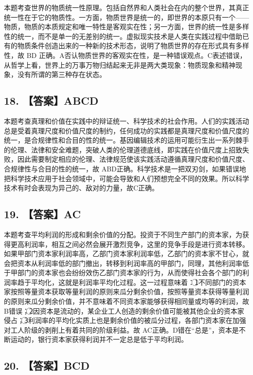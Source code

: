 \documentclass[UTF8,11pt]{ctexart}
\begin{document}
本题考查世界的物质统一性原理。包括自然界和人类社会在内的整个世界，其真正统一性在于它的物质性。一方面，物质世界是统一的，即世界的本原只有一个——物质，物质的本质规定和唯一特性是客观实在性；另一方面，世界的统一性是多样性的统一，而不是单一的无差别的统一。虚拟现实技术是人类在实践过程中借助已有的物质条件创造出来的一种新的技术形态，说明了物质世界的存在形式具有多样性，故 BD 正确。A否认物质世界的客观实在性，是一种错误观点。C表述错误，从哲学上看，世界上的万事万物归结起来无非是两大类现象：物质现象和精神现象，没有所谓的第三种存在状态。


\subsection*{18. 【答案】ABCD}

本题考查真理和价值在实践中的辩证统一、科学技术的社会作用。人们的实践活动总是受着真理尺度和价值尺度的制约，任何成功的实践都是真理尺度和价值尺度的统一，是合规律性和合目的性的统一。基因编辑技术的运用可能衍生出一系列棘手的伦理、法律和安全难题，突破人类的伦理道德底线，即实践在价值尺度上招致失败，因此需要制定相应的伦理、法律规范使该实践活动遵循真理尺度和价值尺度、合规律性与合目的性的统一，故 ABD正确。科学技术是一把双刃剑，如果错误地把科学技术应用于社会领域中，可能会导致和人们预想完全不同的效果。所以科学技术有时会表现为异己的、敌对的力量，故C正确。


\subsection*{19. 【答案】AC}

本题考查平均利润的形成和剩余价值的分配。投资于不同生产部门的资本家，为获得更高利润率，相互之间必然会展开激烈竞争，这里的竞争手段是进行资本转移。如果甲部门资本家利润率高，乙部门资本家利润率低，乙部门的资本家不甘心，就会把资本从利润率低的部门撤出，转移到利润率高的甲部门，同理，其他利润率低于甲部门的资本家也会纷纷效伤乙部门资本家的行为，从而使得社会各个部门的利润率趋于平均化，这就是利润率平均化过程。这一过程意味着：\textcircled{1}不同部门的资本家按照等量资本获取等量利润的原则来瓜分剩余价值，按照等量资本获得等量利润的原则来瓜分剩余价值，并不意味着不同资本家能够获得相同量或均等的利润，故B错误；\textcircled{2}因资本是流动的，某企业工人创造的剩余价值可能被其他企业的资本家侵占；\textcircled{3}利润率的平均化实质上也是剩余价值的被瓜分过程，各部门资本家在加强对工人阶级的剥削上有着共同的阶级利益。故 AC正确。D错在“总是”，资本是不断运动的，银行资本家获得利润并不一定总是低于平均利润。


\subsection*{20. 【答案】BCD}
\end{document}
